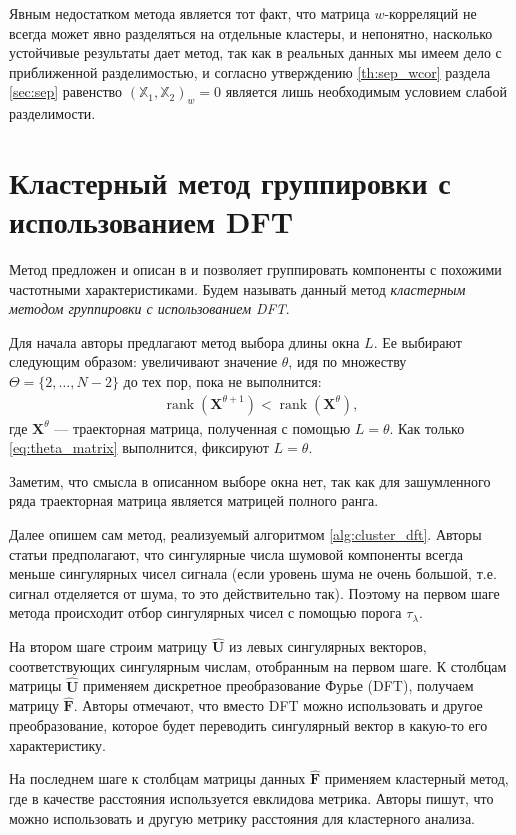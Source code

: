 \documentclass[specialist,
               substylefile = spbu.rtx,
               subf,href,colorlinks=true, 12pt]{disser}
\def\rank{\mathop{\mathrm{rank}}}
\begin{document}
Явным недостатком метода является тот факт, что матрица $w$-корреляций не всегда может явно разделяться на отдельные кластеры, и непонятно, насколько устойчивые результаты дает метод, так как в реальных данных мы имеем дело с приближенной разделимостью, и согласно утверждению \ref{th:sep_wcor} раздела \ref{sec:sep} равенство $\left(\mathbb{X}_1, \mathbb{X}_2 \right)_w = 0$ является лишь необходимым условием слабой разделимости.

\section{Кластерный метод группировки с использованием DFT}
Метод предложен и описан в \cite{Alvarez2013} и позволяет группировать компоненты с похожими частотными характеристиками. Будем называть данный метод \textit{кластерным  методом группировки с использованием DFT}.

Для начала авторы предлагают метод выбора длины окна $L$.
Ее выбирают следующим образом: увеличивают значение $\theta$, идя по множеству $\Theta = \{2,\ldots,N -2\}$ до тех пор, пока не выполнится:
\begin{gather}
\label{eq:theta_matrix}
\rank(\mathbf{X}^{\theta+1}) < \rank(\mathbf{X}^{\theta}),
\end{gather}
где $\mathbf{X}^{\theta}$ --- траекторная матрица, полученная с помощью $L = \theta$. Как только \eqref{eq:theta_matrix} выполнится, фиксируют $L = \theta$.

Заметим, что смысла в описанном выборе окна нет, так как для зашумленного ряда траекторная матрица является матрицей полного ранга.

Далее опишем сам метод, реализуемый алгоритмом \ref{alg:cluster_dft}.
Авторы статьи предполагают, что сингулярные числа шумовой компоненты всегда меньше сингулярных чисел сигнала (если уровень шума не очень большой, т.е. сигнал отделяется от шума, то это действительно так). Поэтому на первом шаге метода происходит отбор сингулярных чисел с помощью порога $\tau_\lambda$.

На втором шаге строим матрицу  $\mathbf{\hat U}$ из левых сингулярных векторов, соответствующих сингулярным числам, отобранным на первом шаге. К столбцам матрицы $\mathbf{\hat U}$ применяем дискретное преобразование Фурье (DFT), получаем матрицу $\mathbf{\hat F}$. Авторы отмечают, что вместо DFT можно использовать и другое преобразование, которое будет переводить сингулярный вектор в какую-то его характеристику.

На последнем шаге к столбцам матрицы данных $\mathbf{\hat F}$ применяем кластерный метод, где в качестве расстояния используется евклидова метрика. Авторы пишут, что можно использовать и другую метрику расстояния для кластерного анализа.
\end{document}
